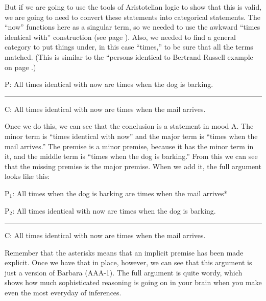 But if we are going to use the tools of Aristotelian logic to show that this is valid, we are going to need to convert these statements into categorical statements. The ``now'' functions here as a singular term, so we needed to use the awkward ``times identical with'' construction (see page \pageref{subsec:singular_propositions}). Also, we needed to find a general category to put things under, in this case ``times,'' to be sure that all the terms matched. (This is similar to the ``persons identical to Bertrand Russell example on page \pageref{finding_general_terms}.) 

\begin{earg}
\item[P:] All times identical with now are times when the dog is barking.
\vspace{-.5em}
\item [] \rule{0.7\linewidth}{.5pt} 
\item[C:] All times identical with now are times when the mail arrives.
\end{earg} 

Once we do this, we can see that the conclusion is a statement in mood A. The minor term is ``times identical with now'' and the major term is ``times when the mail arrives.'' The premise is a minor premise, because it has the minor term in it, and the middle term is ``times when the dog is barking.'' From this we can see that the missing premise is the major premise. When we add it, the full argument looks like this:

\begin{earg}
\item[P$_1$:] All times when the dog is barking are times when the mail arrives*
\item[P$_2$:] All times identical with now are times when the dog is barking.
\vspace{-.5em}
\item [] \rule{0.7\linewidth}{.5pt} 
\item[C:] All times identical with now are times when the mail arrives.
\end{earg} 

Remember that the asterisks means that an implicit premise has been made explicit. Once we have that in place, however, we can see that this argument is just a version of Barbara (AAA-1). The full argument is quite wordy, which shows how much sophisticated reasoning is going on in your brain when you make even the most everyday of inferences. 

